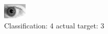 \begin{figure}[h!]
\begin{center}
\includegraphics[width=0.60\columnwidth]{figures/ID247_class_4_target_3.png}
\end{center}
\caption{ Classification: 4 actual target: 3}
\label{fig:ID247_class_4_target_3}
\end{figure}
